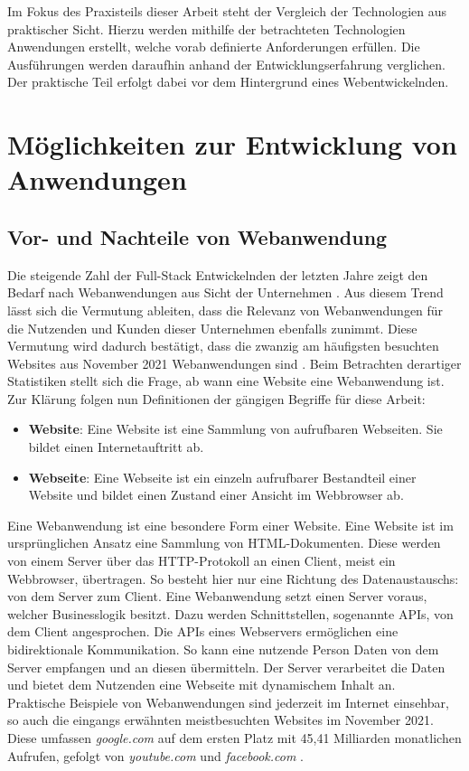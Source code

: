 \documentclass[a4paper]{scrartcl}
\begin{document}
 Im Fokus des Praxisteils dieser Arbeit steht der Vergleich der Technologien aus praktischer Sicht. Hierzu werden mithilfe der betrachteten Technologien Anwendungen erstellt, welche vorab definierte Anforderungen erfüllen. Die Ausführungen werden daraufhin anhand der Entwicklungserfahrung verglichen. Der praktische Teil erfolgt dabei vor dem Hintergrund eines Webentwickelnden.  

\newpage

\section{Möglichkeiten zur Entwicklung von Anwendungen}

\subsection{Vor- und Nachteile von Webanwendung}

Die steigende Zahl der Full-Stack Entwickelnden der letzten Jahre zeigt den Bedarf nach Webanwendungen aus Sicht der Unternehmen \autocite{stackoverflow_2020}. Aus diesem Trend lässt sich die Vermutung ableiten, dass die Relevanz von Webanwendungen für die Nutzenden und Kunden dieser Unternehmen ebenfalls zunimmt. Diese Vermutung wird dadurch bestätigt, dass die zwanzig am häufigsten besuchten Websites aus November 2021 Webanwendungen sind \autocite{Clement}. Beim Betrachten derartiger Statistiken stellt sich die Frage, ab wann eine Website eine Webanwendung ist. Zur Klärung folgen nun Definitionen der gängigen Begriffe für diese Arbeit: 

\begin{itemize}
	\item[] \textbf{Website}: Eine Website ist eine Sammlung von aufrufbaren Webseiten. Sie bildet einen Internetauftritt ab.
	\item[] \textbf{Webseite}: Eine Webseite ist ein einzeln aufrufbarer Bestandteil einer Website und bildet einen Zustand einer Ansicht im Webbrowser ab.
\end{itemize}

Eine Webanwendung ist eine besondere Form einer Website. Eine Website ist im ursprünglichen Ansatz eine Sammlung von HTML-Dokumenten. Diese werden von einem Server über das HTTP-Protokoll an einen Client, meist ein Webbrowser, übertragen. So besteht hier nur eine Richtung des Datenaustauschs: von dem Server zum Client. Eine Webanwendung setzt einen Server voraus, welcher Businesslogik besitzt. Dazu werden Schnittstellen, sogenannte APIs, von dem Client angesprochen. Die APIs eines Webservers ermöglichen eine bidirektionale Kommunikation. So kann eine nutzende Person Daten von dem Server empfangen und an diesen übermitteln. Der Server verarbeitet die Daten und bietet dem Nutzenden eine Webseite mit dynamischem Inhalt an. \\
Praktische Beispiele von Webanwendungen sind jederzeit im Internet einsehbar, so auch die eingangs erwähnten meistbesuchten Websites im November 2021. Diese umfassen \textit{google.com} auf dem ersten Platz mit 45,41 Milliarden monatlichen Aufrufen, gefolgt von \textit{youtube.com} und \textit{facebook.com} \autocite{Clement}. \\
\end{document}
